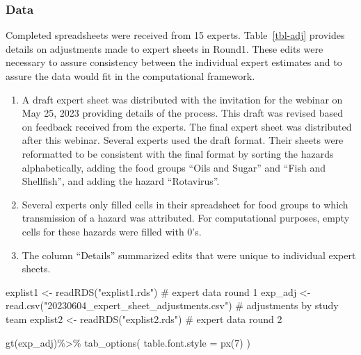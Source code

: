 \documentclass[
  letterpaper,
  DIV=11,
  numbers=noendperiod]{scrartcl}
\newenvironment{Shaded}{\begin{snugshade}}{\end{snugshade}}
\newcommand{\AttributeTok}[1]{\textcolor[rgb]{0.40,0.45,0.13}{#1}}
\newcommand{\CommentTok}[1]{\textcolor[rgb]{0.37,0.37,0.37}{#1}}
\newcommand{\DecValTok}[1]{\textcolor[rgb]{0.68,0.00,0.00}{#1}}
\newcommand{\FunctionTok}[1]{\textcolor[rgb]{0.28,0.35,0.67}{#1}}
\newcommand{\NormalTok}[1]{\textcolor[rgb]{0.00,0.23,0.31}{#1}}
\newcommand{\OtherTok}[1]{\textcolor[rgb]{0.00,0.23,0.31}{#1}}
\newcommand{\SpecialCharTok}[1]{\textcolor[rgb]{0.37,0.37,0.37}{#1}}
\newcommand{\StringTok}[1]{\textcolor[rgb]{0.13,0.47,0.30}{#1}}
\begin{document}
\subsubsection{Data}\label{data-1}

Completed spreadsheets were received from 15 experts.
Table~\ref{tbl-adj} provides details on adjustments made to expert
sheets in Round1. These edits were necessary to assure consistency
between the individual expert estimates and to assure the data would fit
in the computational framework.

\begin{enumerate}
\def\labelenumi{\arabic{enumi}.}
\item
  A draft expert sheet was distributed with the invitation for the
  webinar on May 25, 2023 providing details of the process. This draft
  was revised based on feedback received from the experts. The final
  expert sheet was distributed after this webinar. Several experts used
  the draft format. Their sheets were reformatted to be consistent with
  the final format by sorting the hazards alphabetically, adding the
  food groups ``Oils and Sugar'' and ``Fish and Shellfish'', and adding
  the hazard ``Rotavirus''.
\item
  Several experts only filled cells in their spreadsheet for food groups
  to which transmission of a hazard was attributed. For computational
  purposes, empty cells for these hazards were filled with 0's.
\item
  The column ``Details'' summarized edits that were unique to individual
  expert sheets.
\end{enumerate}

\begin{Shaded}
\begin{Highlighting}[]
\NormalTok{explist1 }\OtherTok{\textless{}{-}} \FunctionTok{readRDS}\NormalTok{(}\StringTok{"explist1.rds"}\NormalTok{) }\CommentTok{\# expert data round 1}
\NormalTok{exp\_adj }\OtherTok{\textless{}{-}} \FunctionTok{read.csv}\NormalTok{(}\StringTok{"20230604\_expert\_sheet\_adjustments.csv"}\NormalTok{) }\CommentTok{\# adjustments by study team}
\NormalTok{explist2 }\OtherTok{\textless{}{-}} \FunctionTok{readRDS}\NormalTok{(}\StringTok{"explist2.rds"}\NormalTok{) }\CommentTok{\# expert data round 2}
\end{Highlighting}
\end{Shaded}

\begin{Shaded}
\begin{Highlighting}[]
\FunctionTok{gt}\NormalTok{(exp\_adj)}\SpecialCharTok{\%\textgreater{}\%} 
  \FunctionTok{tab\_options}\NormalTok{(}
    \AttributeTok{table.font.style =} \FunctionTok{px}\NormalTok{(}\DecValTok{7}\NormalTok{)}
\NormalTok{  )}
\end{Highlighting}
\end{Shaded}
\end{document}
